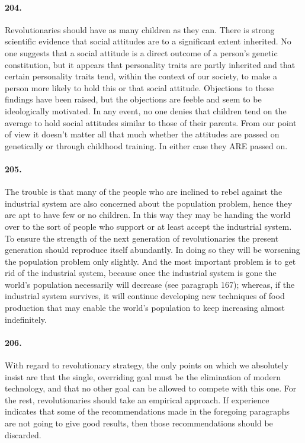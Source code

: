 \documentclass[12pt]{book}
\begin{document}
\paragraph{204.} Revolutionaries should have as many children as they can. There is strong scientific evidence that social attitudes are to a significant extent inherited. No one suggests that a social attitude is a direct outcome of a person's genetic constitution, but it appears that personality traits are partly inherited and that certain personality traits tend, within the context of our society, to make a person more likely to hold this or that social attitude.  Objections to these findings have been raised, but the objections are feeble and seem to be ideologically motivated. In any event, no one denies that children tend on the average to hold social attitudes similar to those of their parents. From our point of view it doesn't matter all that much whether the attitudes are passed on genetically or through childhood training. In either case they ARE passed on.


\paragraph{205.} The trouble is that many of the people who are inclined to rebel against the industrial system are also concerned about the population problem, hence they are apt to have few or no children. In this way they may be handing the world over to the sort of people who support or at least accept the industrial system. To ensure the strength of the next generation of revolutionaries the present generation should reproduce itself abundantly. In doing so they will be worsening the population problem only slightly. And the most important problem is to get rid of the industrial system, because once the industrial system is gone the world's population necessarily will decrease (see paragraph 167); whereas, if the industrial system survives, it will continue developing new techniques of food production that may enable the world's population to keep increasing almost indefinitely.


\paragraph{206.} With regard to revolutionary strategy, the only points on which we absolutely insist are that the single, overriding goal must be the elimination of modern technology, and that no other goal can be allowed to compete with this one. For the rest, revolutionaries should take an empirical approach. If experience indicates that some of the recommendations made in the foregoing paragraphs are not going to give good results, then those recommendations should be discarded.
\end{document}
